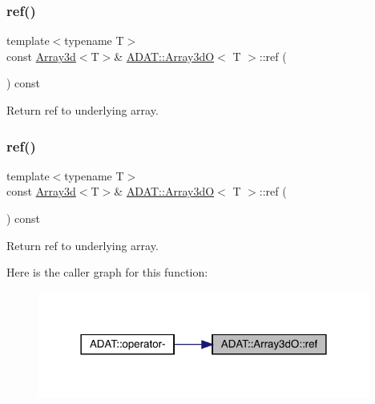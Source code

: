 \subsubsection{\texorpdfstring{ref()}{ref()}\hspace{0.1cm}{\footnotesize\ttfamily [1/6]}}
{\footnotesize\ttfamily template$<$typename T$>$ \\
const \mbox{\hyperlink{classXMLArray_1_1Array3d}{Array3d}}$<$T$>$\& \mbox{\hyperlink{classADAT_1_1Array3dO}{A\+D\+A\+T\+::\+Array3dO}}$<$ T $>$\+::ref (\begin{DoxyParamCaption}{ }\end{DoxyParamCaption}) const\hspace{0.3cm}{\ttfamily [inline]}}



Return ref to underlying array. 

\mbox{\label{classADAT_1_1Array3dO_a7ad48358af907cbaf3cf50fad298a088}} 
\subsubsection{\texorpdfstring{ref()}{ref()}\hspace{0.1cm}{\footnotesize\ttfamily [2/6]}}
{\footnotesize\ttfamily template$<$typename T$>$ \\
const \mbox{\hyperlink{classXMLArray_1_1Array3d}{Array3d}}$<$T$>$\& \mbox{\hyperlink{classADAT_1_1Array3dO}{A\+D\+A\+T\+::\+Array3dO}}$<$ T $>$\+::ref (\begin{DoxyParamCaption}{ }\end{DoxyParamCaption}) const\hspace{0.3cm}{\ttfamily [inline]}}



Return ref to underlying array. 

Here is the caller graph for this function\+:
\nopagebreak
\begin{figure}[H]
\begin{center}
\leavevmode
\includegraphics[width=309pt]{dd/da8/classADAT_1_1Array3dO_a7ad48358af907cbaf3cf50fad298a088_icgraph}
\end{center}
\end{figure}
\mbox{\label{classADAT_1_1Array3dO_a7ad48358af907cbaf3cf50fad298a088}} 
